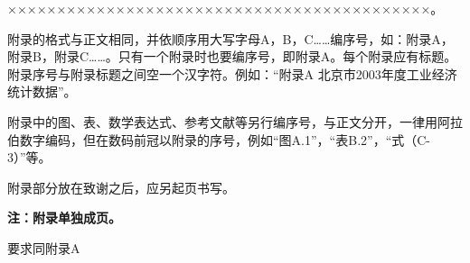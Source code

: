 \appendixchapter
×××××××××××××××××××××××××××××××××××××××××××。


附录的格式与正文相同，并依顺序用大写字母A，B，C……编序号，如：附录A，附录B，附录C……。只有一个附录时也要编序号，即附录A。每个附录应有标题。附录序号与附录标题之间空一个汉字符。例如：“附录A 北京市2003年度工业经济统计数据”。

附录中的图、表、数学表达式、参考文献等另行编序号，与正文分开，一律用阿拉伯数字编码，但在数码前冠以附录的序号，例如“图A.1”，“表B.2”，“式（C-3）”等。

附录部分放在致谢之后，应另起页书写。

\vspace{4cm}

\noindent\textbf{注：附录单独成页。 }



\appendixchapter
 要求同附录A

 